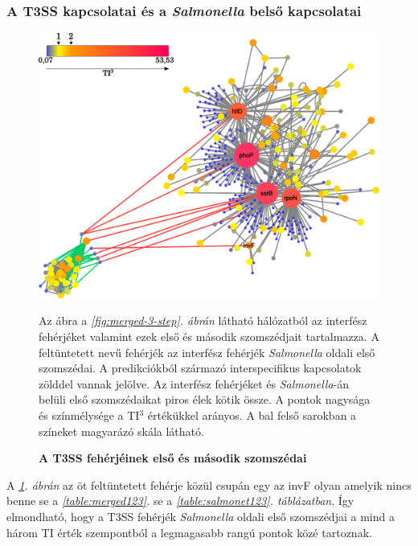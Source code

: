 \documentclass[a4paper,12pt]{article}
\newenvironment{imgdesc}{
		\small
		\singlespacing
		\begin{center}
		
	}{
		\end{center}	
	}
\begin{document}
		\subsubsection{A T3SS kapcsolatai és a \textit{Salmonella} belső kapcsolatai}
		
		\begin{figure}[H]
			\includegraphics[scale=0.6]{img/t3ss-inner-salmonella.pdf}
			\centering
			\caption{ \textbf{A T3SS fehérjéinek első és második szomszédai}}
			\begin{imgdesc}
				Az ábra a \textit{\ref{fig:merged-3-step}. ábrán} látható hálózatból az interfész fehérjéket valamint ezek első és második szomszédjait tartalmazza. A feltüntetett nevű fehérjék az interfész fehérjék \textit{Salmonella} oldali első szomszédai. A predikciókból származó interspecifikus kapcsolatok zölddel vannak jelölve. Az interfész fehérjéket és \textit{Salmonella}-án belüli első szomszédaikat piros élek kötik össze. A pontok nagysága és színmélysége a TI$^3$ értékükkel arányos. A bal felső sarokban a színeket magyarázó skála látható.
			\end{imgdesc}
			\label{fig:t3ss_inner}			 		 
		\end{figure}

		A \textit{\ref{fig:t3ss_inner}. ábrán} az öt feltüntetett fehérje közül csupán egy az invF olyan amelyik nincs benne se a \textit{\ref{table:merged123}.} se a \textit{\ref{table:salmonet123}. táblázatban}. Így elmondható, hogy a T3SS fehérjék \textit{Salmonella} oldali első szomszédjai a mind a három TI érték szempontból a legmagasabb rangú pontok közé tartoznak.
\end{document}
